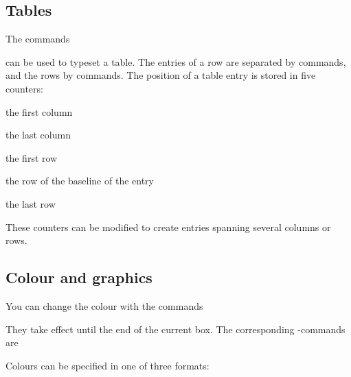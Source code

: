 \subsection{Tables}   %


The commands
\begin{code}
  \cs{\begintable}

  \cs{\endtable}

  \cs{\newtableentry}

  \cs{\newtablerow}
\end{code}
can be used to typeset a table. The entries of a row are separated by \cs{\newtableentry} commands, and the rows
by \cs{\newtablerow} commands. The position of a table entry is stored in five counters\?:

\begin{description}
\item{}the first column
\item{}the last column
\item{}the first row
\item{}the row of the baseline of the entry
\item{}the last row
\end{description}
These counters can be modified to create entries spanning several columns or rows.


\subsection{Colour and graphics}   %


You can change the colour with the commands
\begin{code}
  \cs{\setgreycolour} 

  \cs{\setrgbcolour}   

  \cs{\setcmykcolour}    
\end{code}
They take effect until the end of the current box.
The corresponding \AL-commands are
\begin{code}
   

   

   
\end{code}
Colours can be specified in one of three formats\?:
\begin{code}
   \cs{)}

   \cs{,} \cs{,} \cs{)}

   \cs{,} \cs{,} \cs{,} \cs{)}
\end{code}

